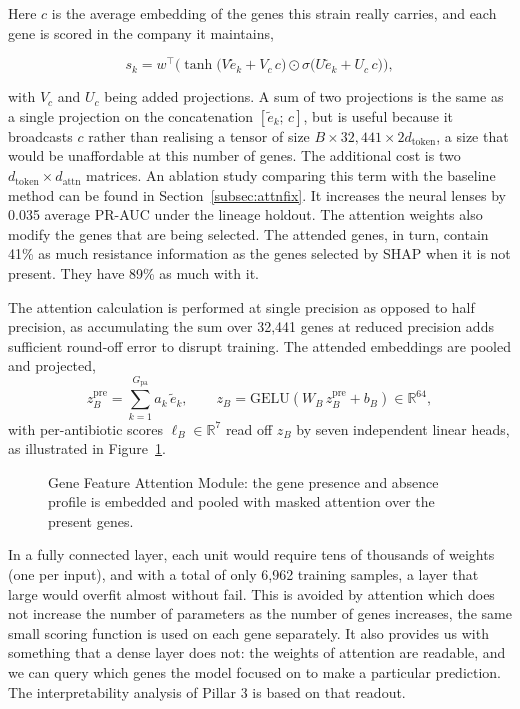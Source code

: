 Here $c$ is the average embedding of the genes this strain really carries, and each gene is
scored in the company it maintains,

\begin{equation}
s_k = w^\top\Big(\tanh\big(V \tilde{e}_k + V_c\, c\big) \odot
\sigma\big(U \tilde{e}_k + U_c\, c\big)\Big),
\label{eq:expertB_score}
\end{equation}

with $V_c$ and $U_c$ being added projections. A sum of two projections is the same as a single
projection on the concatenation $[\tilde{e}_k;\, c]$, but is useful because it broadcasts $c$
rather than realising a tensor of size $B \times 32{,}441 \times 2 d_{\mathrm{token}}$, a size
that would be unaffordable at this number of genes. The additional cost is two
$d_{\mathrm{token}} \times d_{\mathrm{attn}}$ matrices. An ablation study comparing this term with the
baseline method can be found in Section~\ref{subsec:attnfix}. It increases the neural lenses by
0.035 average PR-AUC under the lineage holdout. The attention weights also modify the genes
that are being selected. The attended genes, in turn, contain 41\% as much resistance
information as the genes selected by SHAP when it is not present. They have 89\% as much
with it.

\vspace{1em}

The attention calculation is performed at single precision as opposed to half precision, as
accumulating the sum over 32{,}441 genes at reduced precision adds sufficient round-off error
to disrupt training. The attended embeddings are pooled and projected,
\begin{equation}
z_B^{\mathrm{pre}} = \sum_{k=1}^{G_{\mathrm{pa}}} a_k\, \tilde{e}_k,
\qquad
z_B = \mathrm{GELU}\!\left(W_B\, z_B^{\mathrm{pre}} + b_B\right) \in \mathbb{R}^{64},
\label{eq:expertB_out}
\end{equation}
with per-antibiotic scores $\ell_B \in \mathbb{R}^{7}$ read off $z_B$ by seven independent
linear heads, as illustrated in Figure~\ref{fig:expertB}.

\begin{figure}[H]
  \centering
  \resizebox{\textwidth}{!}{}
  \caption{Gene Feature Attention Module: the gene presence and absence profile is embedded and pooled with masked attention over the present genes.}
  \label{fig:expertB}
\end{figure}

In a fully connected layer, each unit would require tens of thousands of weights (one per
input), and with a total of only 6{,}962 training samples, a layer that large would overfit
almost without fail. This is avoided by attention which does not increase the number of parameters as
the number of genes increases, the same small scoring function is used on each gene
separately. It also provides us with something that a dense layer does not: the weights of
attention are readable, and we can query which genes the model focused on to make a
particular prediction. The interpretability analysis of Pillar 3 is based on that readout.

